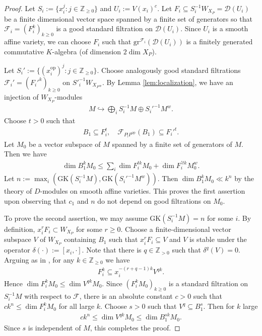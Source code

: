 \documentclass[11pt,a4paper,usenames,dvipsnames,reqno]{amsart}
\numberwithin{equation}{section}
\newcommand{\zz}{\mathbb Z}
\theoremstyle{definition}
\theoremstyle{remark}
\begin{document}
\begin{proof}
 Let $S_i:=\{ x_i^j: j\in \zz_{\ge 0}\}$ and  $U_i:=V(x_i)^c$. Let $F_i\subseteq S^{-1}_i W_{X_P}=\mathcal{D}(U_i)$ be a finite dimensional vector space spanned by a finite set of generators so that $\mathcal{F}_i=(F_i^k)_{k\ge 0}$ is a good standard filtration on $\mathcal{D}(U_i)$. Since $U_i$ is a smooth affine variety, we can choose $F_i$ such that $\mathrm{gr}^{\mathcal{F}_i}(\mathcal{D}(U_i))$ is a finitely generated commutative $K$-algebra (of dimension $2\dim X_P$).
 
 Let $S_i':=\{ (x_i^{\mathrm{op}})^j: j\in \zz_{\ge 0}\}.$ Choose analogously good standard filtrations $\mathcal{F}_i'=(F_i'^k)_{k\ge 0}$ on $S'^{-1}_i W_{X_{P^\mathrm{op}}}.$ By Lemma \ref{lem:localization}, we have an injection of $W_{X_P}$-modules
    \begin{align*}
        M\hookrightarrow \bigoplus_i S_i^{-1}M\oplus S_i'^{-1}M^w.
    \end{align*}
Choose $t>0$ such that
    \begin{align*}
        B_1\subseteq F_{i}^t, \quad \mathcal{F}_{P|P^{\mathrm{op}}}(B_1)\subseteq F_{i}'^t.
    \end{align*}
    Let $M_0$ be a vector subspace of $M$ spanned by a finite set of generators of $M$. Then we have
    \begin{align*}
        \dim B_1^kM_0\le \sum_{i} \dim F_{i}^{tk}M_0+\dim F_{i}^{'tk}M_0^w.
    \end{align*}
     Let $n:=\max_i (\mathrm{GK}(S_i^{-1}M), \mathrm{GK}(S_i'^{-1}M^w))$. Then $\dim B_1^kM_0\ll k^n$ by the theory of $D$-modules on smooth affine varieties.   This proves the first assertion upon observing that $c_1$ and $n$ do not depend on good filtrations on $M_0$.

     
     To prove the second assertion, we may assume $\mathrm{GK}(S_i^{-1}M)=n$ for some $i$. By definition, $x_i^rF_i\subset W_{X_P}$ for some $r\ge  0$. Choose a finite-dimensional vector subspace $V$ of $W_{X_P}$ containing $B_1$ such that $x_i^rF_i\subseteq V$ and $V$ is stable under the operator $\delta(\cdot):=[x_i,\cdot].$ Note that there is $q\in \zz_{>0}$ such that $\delta^q(V)=0.$ Arguing as in \cite[Lemma 15.4.2]{noncomm}, for any $k\in \zz_{\ge 0}$ we have
    \begin{align*}
        F_i^{k}\subseteq x_i^{-(r+q-1)k}V^{qk}.
    \end{align*} 
    Hence $\dim F_i^kM_0\le \dim V^{qk}M_0.$ Since $(F_i^kM_0)_{k\ge 0}$ is a standard filtration on $S^{-1}_iM$ with respect to $\mathcal{F}$, there is an absolute constant $c>0$ such that $ck^{n}\le\dim F_i^kM_0$ for all large $k$. Choose $s>0$ such that $V^{q}\subseteq B_1^{s}$. Then for $k$ large
    \begin{align*}
        ck^{n}\le \dim V^{qk}M_0\le \dim B_1^{sk}M_0.
    \end{align*}
    Since $s$ is independent of $M$, this completes the proof.
\end{proof}
\end{document}
